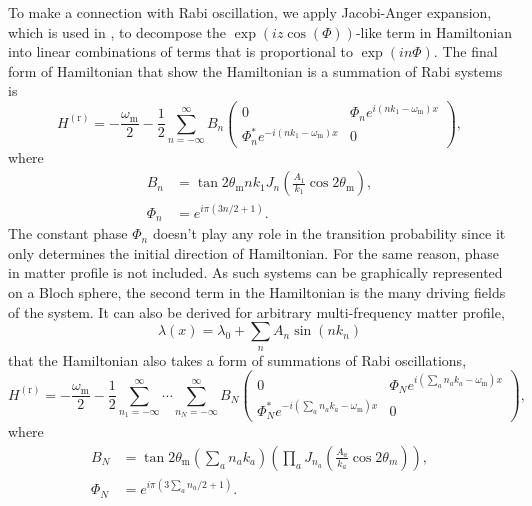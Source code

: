 \documentclass[%
reprint,
 amsmath,amssymb,
 aps,
]{revtex4-1}
\begin{document}
To make a connection with Rabi oscillation, we apply Jacobi-Anger expansion, which is used in \cite{Kneller2013}, to decompose the $\exp\left( i z \cos\left(\Phi \right) \right)$-like term in Hamiltonian into linear combinations of terms that is proportional to $\exp\left(i n \Phi \right)$. The final form of Hamiltonian that show the Hamiltonian is a summation of Rabi systems is
\begin{equation}
    H^{(\mathrm{r})} = -\frac{\omega_{\mathrm{m}}}{2} -  \frac{1}{2} \sum_{n=-\infty}^\infty B_n \begin{pmatrix}
    0 &  \Phi_n e^{i (n k_1-\omega_{\mathrm{m}}) x} \\
     \Phi_n^* e^{ - i (n k_1 -\omega_{\mathrm{m}}) x} & 0
    \end{pmatrix},
\end{equation}
where
\begin{align*}
    B_n &= \tan 2\theta_{\mathrm m} n k_1 J_{n} \left( \frac{A_1}{k_1}\cos 2\theta_{\mathrm m} \right),\\
    \Phi_n &= e^{i\pi (3n/2+1)}.
\end{align*}
The constant phase $\Phi_n$ doesn't play any role in the transition probability since it only determines the initial direction of Hamiltonian. For the same reason, phase in matter profile is not included. As such systems can be graphically represented on a Bloch sphere, the second term in the Hamiltonian is the many driving fields of the system. It can also be derived for arbitrary multi-frequency matter profile,
\begin{equation}
    \lambda(x) = \lambda_0 + \sum_n A_n \sin (n k_n)
\end{equation}
that the Hamiltonian also takes a form of summations of Rabi oscillations,
\begin{equation}
    H^{(\mathrm r)} = -\frac{\omega_{\mathrm m}}{2} - \frac{1}{2} \sum_{n_1=-\infty}^\infty \cdots \sum_{n_N = -\infty}^\infty B_N 
    \begin{pmatrix}
    0 & \Phi_N e^{i\left( \sum_a n_a k_a - \omega_{\mathrm{m}}\right)x} \\
    \Phi_N^* e^{-i\left( \sum_a n_a k_a - \omega_{\mathrm{m}}\right)x} & 0
    \end{pmatrix},
\end{equation}
where
\begin{align*}
    B_N &=  \tan 2\theta_{\mathrm m} \left( \sum_a n_a k_a \right) \left( \prod_a J_{n_a}\left( \frac{A_a}{k_a}\cos 2\theta_m \right) \right),\\
    \Phi_N &= e^{i\pi (3\sum_a n_a/2+1)}.
\end{align*}
\end{document}
